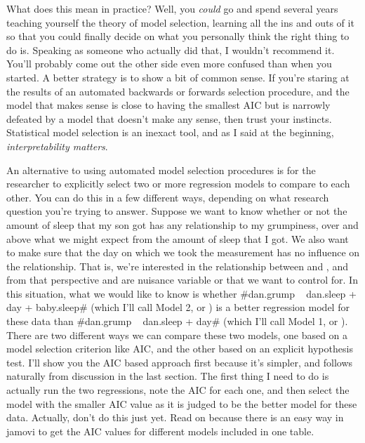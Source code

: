 What does this mean in practice? Well, you {\it could} go and spend several years teaching yourself the theory of model selection, learning all the ins and outs of it so that you could finally decide on what you personally think the right thing to do is. Speaking as someone who actually did that, I wouldn't recommend it. You'll probably come out the other side even more confused than when you started. A better strategy is to show a bit of common sense. If you're staring at the results of an automated backwards or forwards selection procedure, and the model that makes sense is close to having the smallest AIC but is narrowly defeated by a model that doesn't make any sense, then trust your instincts. Statistical model selection is an inexact tool, and as I said at the beginning, {\it interpretability matters}. 


An alternative to using automated model selection procedures is for the researcher to explicitly select two or more regression models to compare to each other. You can do this in a few different ways, depending on what research question you're trying to answer. Suppose we want to know whether or not the amount of sleep that my son got has any relationship to my grumpiness, over and above what we might expect from the amount of sleep that I got. We also want to make sure that the day on which we took the measurement has no influence on the relationship. That is, we're interested in the relationship between  and , and from that perspective  and  are nuisance variable or  that we want to control for. In this situation, what we would like to know is whether \rtextverb#dan.grump ~ dan.sleep + day + baby.sleep# (which I'll call Model 2, or ) is a better regression model for these data than \rtextverb#dan.grump ~ dan.sleep + day# (which I'll call Model 1, or ). There are two different ways we can compare these two models, one based on a model selection criterion like AIC, and the other based on an explicit hypothesis test. I'll show you the AIC based approach first because it's simpler, and follows naturally from discussion in the last section. The first thing I need to do is actually run the two regressions, note the AIC for each one, and then select the model with the smaller AIC value as it is judged to be the better model for these data. Actually, don't do this just yet. Read on because there is an easy way in jamovi to get the AIC values for different models included in one table.

